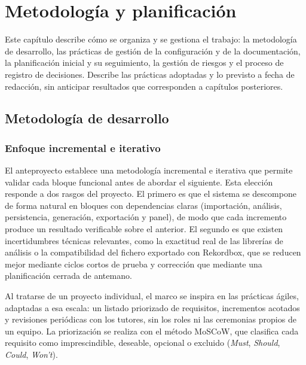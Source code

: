 
\chapter{Metodología y planificación}
\label{cha:metodologia}

Este capítulo describe cómo se organiza y se gestiona el trabajo: la metodología de desarrollo, las prácticas de gestión de la configuración y de la documentación, la planificación inicial y su seguimiento, la gestión de riesgos y el proceso de registro de decisiones. Describe las prácticas adoptadas y lo previsto a fecha de redacción, sin anticipar resultados que corresponden a capítulos posteriores.

\section{Metodología de desarrollo}
\label{sec:met-metodologia}

\subsection{Enfoque incremental e iterativo}

El anteproyecto establece una metodología incremental e iterativa que permite validar cada bloque funcional antes de abordar el siguiente. Esta elección responde a dos rasgos del proyecto. El primero es que el sistema se descompone de forma natural en bloques con dependencias claras (importación, análisis, persistencia, generación, exportación y panel), de modo que cada incremento produce un resultado verificable sobre el anterior. El segundo es que existen incertidumbres técnicas relevantes, como la exactitud real de las librerías de análisis o la compatibilidad del fichero exportado con Rekordbox, que se reducen mejor mediante ciclos cortos de prueba y corrección que mediante una planificación cerrada de antemano.

Al tratarse de un proyecto individual, el marco se inspira en las prácticas ágiles, adaptadas a esa escala: un listado priorizado de requisitos, incrementos acotados y revisiones periódicas con los tutores, sin los roles ni las ceremonias propios de un equipo. La priorización se realiza con el método MoSCoW, que clasifica cada requisito como imprescindible, deseable, opcional o excluido (\emph{Must}, \emph{Should}, \emph{Could}, \emph{Won't}).

